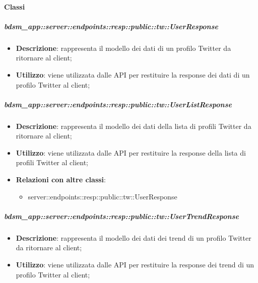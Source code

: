 	\paragraph{Classi} %

    \subparagraph{bdsm\_app::server::endpoints::resp::public::tw::UserResponse} %
    \label{subp:bdsm_app_server_endpoints_resp_public_tw_userresponse}
    \begin{itemize}
      \item \textbf{Descrizione}: rappresenta il modello dei dati di un profilo Twitter da ritornare al client;
      \item \textbf{Utilizzo}: viene utilizzata dalle API per restituire la response dei dati di un profilo Twitter al client;
      \end{itemize}

    \subparagraph{bdsm\_app::server::endpoints::resp::public::tw::UserListResponse} %
    \label{subp:bdsm_app_server_endpoints_resp_public_tw_userlistresponse}
    \begin{itemize}
      \item \textbf{Descrizione}: rappresenta il modello dei dati della lista di profili Twitter da ritornare al client;
      \item \textbf{Utilizzo}: viene utilizzata dalle API per restituire la response della lista di profili Twitter al client;
      \item \textbf{Relazioni con altre classi}:
        \begin{itemize}
          \item server::endpoints::resp::public::tw::UserResponse
        \end{itemize}
      \end{itemize}

    \subparagraph{bdsm\_app::server::endpoints::resp::public::tw::UserTrendResponse} %
    \label{subp:bdsm_app_server_endpoints_resp_public_tw_usertrendresponse}
    \begin{itemize}
      \item \textbf{Descrizione}: rappresenta il modello dei dati dei trend di un profilo Twitter da ritornare al client;
      \item \textbf{Utilizzo}: viene utilizzata dalle API per restituire la response dei trend di un profilo Twitter al client;
      \end{itemize}

